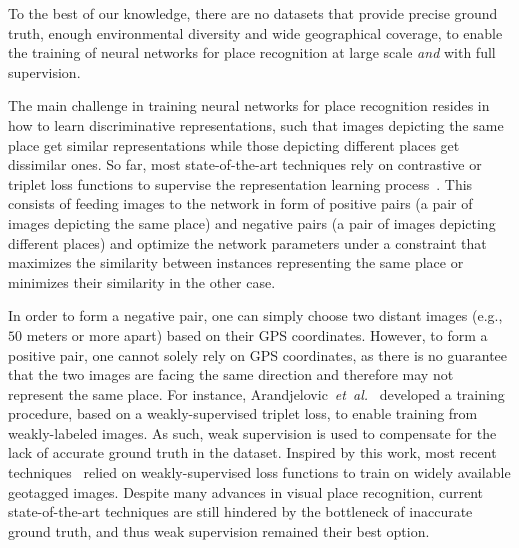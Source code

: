 \documentclass{article}
\newcommand{\etal}{\textit{et~al.}}
\begin{document}
To the best of our knowledge, there are no datasets that provide precise ground truth, enough environmental diversity and wide geographical coverage, to enable the training of neural networks for place recognition at large scale \emph{and} with full supervision.

The main challenge in training neural networks for place recognition resides in how to learn discriminative representations, such that images depicting the same place get similar representations while those depicting different places get dissimilar ones. So far, most state-of-the-art techniques rely on contrastive or triplet  loss functions to supervise the representation learning process~\cite{zhang2021visual}. This consists of feeding images to the network in form of positive pairs (a pair of images depicting the same place) and negative pairs (a pair of images depicting different places) and optimize the network parameters under a constraint that maximizes the similarity between instances representing the same place or minimizes their similarity in the other case. 

In order to form a negative pair, one can simply choose two distant images (e.g., $50$ meters or more apart) based on their GPS coordinates. However, to form a positive pair, one cannot solely rely on GPS coordinates, as there is no guarantee that the two images are facing the same direction and therefore may not represent the same place.
For instance, Arandjelovic~\etal~\cite{arandjelovic2016netvlad} developed a training procedure, based on a weakly-supervised triplet loss, to enable training from weakly-labeled images. As such, weak supervision is used to compensate for the lack of accurate ground truth in the dataset. Inspired by this work, most recent techniques~\cite{arandjelovic2016netvlad, kim2017learned, liu2019stochastic, ge2020self} relied on weakly-supervised loss functions to train on widely available geotagged images. Despite many advances in visual place recognition, current state-of-the-art techniques are still hindered by the bottleneck of inaccurate ground truth, and thus weak supervision remained their best option.
\end{document}
